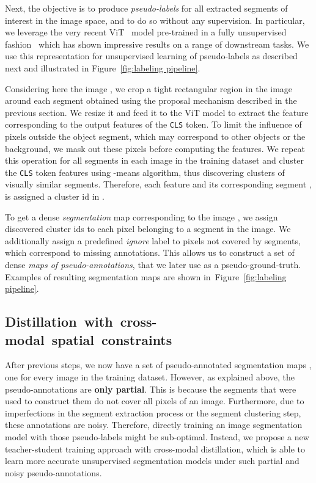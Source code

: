 \documentclass[runningheads]{llncs}
\begin{document}
Next, the objective is to produce \emph{pseudo-labels} for all extracted segments of interest in the image space, and to do so without any supervision. In particular, we leverage the very recent ViT~\cite{dosovitskiy2021image} model pre-trained in a fully unsupervised fashion~\cite{caron2021emerging} which has shown impressive results on a range of downstream tasks. We use this representation for unsupervised learning of pseudo-labels as described next and illustrated in Figure~\ref{fig:labeling pipeline}. 

Considering here the image , we crop a tight rectangular region in the image around each segment   obtained using the proposal mechanism described in the previous section. We resize it and feed it to the ViT model to extract the feature  corresponding to the output features of the \texttt{CLS} token. To limit the influence of pixels outside the object segment, which may correspond to other objects or the background, we mask out these pixels before computing the features. We repeat this operation for all segments in each image  in the training dataset and cluster the \texttt{CLS} token features using -means algorithm, thus discovering  clusters of visually similar segments. Therefore, each feature  and its corresponding segment , is assigned a cluster id  in .

To get a dense \emph{segmentation} map  corresponding to the image , we assign discovered cluster ids to each pixel belonging to a segment in the image. We additionally assign a predefined \emph{ignore} label to pixels not covered by segments, which correspond to missing annotations. This allows us to construct a set  of dense \emph{maps of pseudo-annotations}, that we later use as a pseudo-ground-truth. Examples of resulting segmentation maps are shown in~Figure~\ref{fig:labeling pipeline}.

\subsection{\mbox{Distillation with cross-modal spatial constraints}}
\label{sec:distillation}

After previous steps, we now have a set of pseudo-annotated segmentation maps , one for every image  in the training dataset. However, as explained above, the pseudo-annotations are \textbf{only partial}. This is because the segments that were used to construct them do not cover all pixels of an image. Furthermore, due to imperfections in the segment extraction process or the segment clustering step, these annotations are noisy. Therefore, directly training an image segmentation model with those pseudo-labels might be sub-optimal. Instead, we propose a new teacher-student training approach with cross-modal distillation, which is able to learn more accurate unsupervised segmentation models under such partial and noisy pseudo-annotations. 
\end{document}
